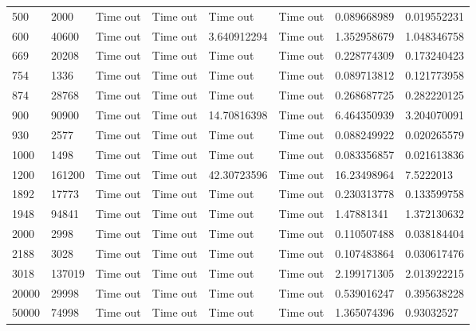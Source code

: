 \begin{landscape}
\begin{longtabu} {|l|l|l|l|l|l|l|l|}
500       & 2000    & Time out & Time out & Time out       & Time out & 0.089668989 & 0.019552231 \\
600       & 40600   & Time out & Time out & 3.640912294    & Time out & 1.352958679 & 1.048346758 \\
669       & 20208   & Time out & Time out & Time out       & Time out & 0.228774309 & 0.173240423 \\
754       & 1336    & Time out & Time out & Time out       & Time out & 0.089713812 & 0.121773958 \\
874       & 28768   & Time out & Time out & Time out       & Time out & 0.268687725 & 0.282220125 \\
900       & 90900   & Time out & Time out & 14.70816398    & Time out & 6.464350939 & 3.204070091 \\
930       & 2577    & Time out & Time out & Time out       & Time out & 0.088249922 & 0.020265579 \\
1000      & 1498    & Time out & Time out & Time out       & Time out & 0.083356857 & 0.021613836 \\
1200      & 161200  & Time out & Time out & 42.30723596    & Time out & 16.23498964 & 7.5222013   \\
1892      & 17773   & Time out & Time out & Time out       & Time out & 0.230313778 & 0.133599758 \\
1948      & 94841   & Time out & Time out & Time out       & Time out & 1.47881341  & 1.372130632 \\
2000      & 2998    & Time out & Time out & Time out       & Time out & 0.110507488 & 0.038184404 \\
2188      & 3028    & Time out & Time out & Time out       & Time out & 0.107483864 & 0.030617476 \\
3018      & 137019  & Time out & Time out & Time out       & Time out & 2.199171305 & 2.013922215 \\
20000     & 29998   & Time out & Time out & Time out       & Time out & 0.539016247 & 0.395638228 \\
50000     & 74998   & Time out & Time out & Time out       & Time out & 1.365074396 & 0.93032527  \\ \bottomrule
\end{longtabu}
\end{landscape}